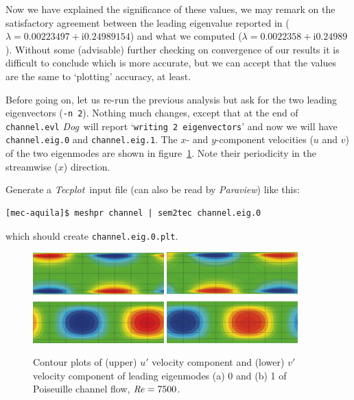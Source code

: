 \documentclass[11pt,a4paper]{report}
\newcommand\Rey{\mbox{\textit{Re}}}
\newcommand\ci{\mathrm{i}}
\newcommand{\Dog}{\emph{Dog}}
\newcommand{\Tecplot}{\emph{Tecplot}}
\newcommand{\Paraview}{\emph{Paraview}}
\begin{document}
Now we have explained the significance of these values, we may remark
on the satisfactory agreement between the leading eigenvalue reported
in \citet{chqz88} ($\lambda=0.00223497+\ci 0.24989154$) and what we
computed ($\lambda=0.0022358+\ci 0.24989$). Without some (advisable)
further checking on convergence of our results it is difficult to
conclude which is more accurate, but we can accept that the values are
the same to `plotting' accuracy, at least.

Before going on, let us re-run the previous analysis but ask for the
two leading eigenvectors (\verb+-n 2+).  Nothing much changes, except that
at the end of \verb+channel.evl+ \Dog\ will report `\texttt{writing 2
  eigenvectors}' and now we will have \verb+channel.eig.0+ and
\verb+channel.eig.1+. The $x$- and $y$-component velocities ($u$ and
$v$) of the two eigenmodes are shown in figure~\ref{fig.chanmodes}.
Note their periodicity in the streamwise ($x$) direction.

Generate a \Tecplot\ input file (can also be read by \Paraview)
like this:
\begin{verbatim}
[mec-aquila]$ meshpr channel | sem2tec channel.eig.0
\end{verbatim}
\noindent which should create \verb+channel.eig.0.plt+.

\begin{figure}
\begin{center}
\includegraphics[width=0.45\textwidth]{export0.pdf}
\includegraphics[width=0.45\textwidth]{export1.pdf}
\end{center}
\caption{Contour plots of (upper) $u'$ velocity component and (lower)
  $v'$ velocity component of leading eigenmodes (a) 0 and (b) 1 of
  Poiseuille channel flow, $\Rey=7500$.}
\label{fig.chanmodes}
\end{figure}
\end{document}
